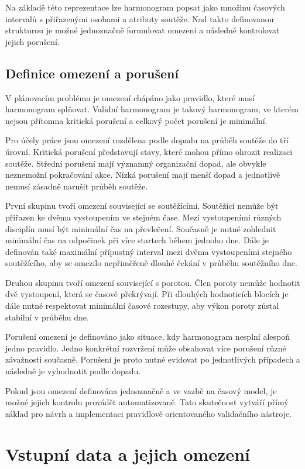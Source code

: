 \documentclass[czech, kiv, ba, he, iso690alph, pdf]{fasthesis}
\begin{document}
				Na základě této reprezentace lze harmonogram popsat jako množinu časových intervalů s přiřazenými osobami a atributy soutěže. Nad takto definovanou strukturou je možné jednoznačně formulovat omezení a následně kontrolovat jejich porušení.
	

			\subsection{Definice omezení a porušení}
	
				V plánovacím problému je omezení chápáno jako pravidlo, které musí harmonogram splňovat. Validní harmonogram je takový harmonogram, ve kterém nejsou přítomna kritická porušení a celkový počet porušení je minimální.
	
				Pro účely práce jsou omezení rozdělena podle dopadu na průběh soutěže do tří úrovní. Kritická porušení představují stavy, které mohou přímo ohrozit realizaci soutěže. Střední porušení mají významný organizační dopad, ale obvykle neznemožní pokračování akce. Nízká porušení mají menší dopad a jednotlivě nemusí zásadně narušit průběh soutěže.
	
				První skupinu tvoří omezení související se soutěžícími. Soutěžící nemůže být přiřazen ke dvěma vystoupením ve stejném čase. Mezi vystoupeními různých disciplín musí být minimální čas na převlečení. Současně je nutné zohlednit minimální čas na odpočinek při více startech během jednoho dne. Dále je definován také maximální přípustný interval mezi dvěma vystoupeními stejného soutěžícího, aby se omezilo nepřiměřeně dlouhé čekání v průběhu soutěžního dne.
	
				Druhou skupinu tvoří omezení související s porotou. Člen poroty nemůže hodnotit dvě vystoupení, která se časově překrývají. Při dlouhých hodnoticích blocích je dále nutné respektovat minimální časové rozestupy, aby výkon poroty zůstal stabilní v průběhu dne.
	
				Porušení omezení je definováno jako situace, kdy harmonogram nesplní alespoň jedno pravidlo. Jedno konkrétní rozvržení může obsahovat více porušení různé závažnosti současně. Porušení je proto nutné evidovat po jednotlivých případech a následně je vyhodnotit podle dopadu.
	
				Pokud jsou omezení definována jednoznačně a ve vazbě na časový model, je možné jejich kontrolu provádět automatizovaně. Tato skutečnost vytváří přímý základ pro návrh a implementaci pravidlově orientovaného validačního nástroje.
	

		\section{Vstupní data a jejich omezení}
\end{document}
